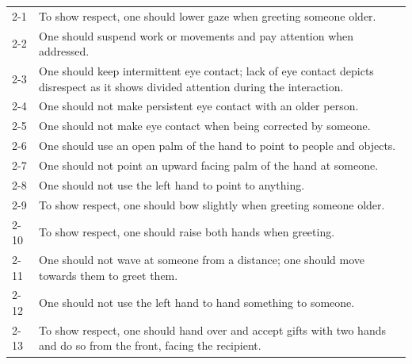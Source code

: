 \documentclass{CSSRforAfrica}
\begin{document}
\begin{table}[H]
\begin{center}
\begin{tabularx}{\linewidth}{|l|X|}
\hline \hline
 {\small 2-1}   & {\small To show respect, one should lower gaze when greeting someone older.} \vspace{-10mm}\\
 {\small 2-2 }   & {\small  One should suspend work or movements and pay attention when addressed.}\vspace{-10mm}\\
 {\small 2-3 } & {\small  One should keep intermittent eye contact; lack of eye contact depicts disrespect as it shows divided attention during the interaction. }\\
 {\small 2-4 }  & {\small  One should not make persistent eye contact with an older person. }\vspace{-1mm}\\
 {\small 2-5 } & {\small  One should not make eye contact when being corrected by someone. }\vspace{-1mm}\\
 {\small 2-6}   & {\small One should use an open palm of the hand to point to people and objects.}\vspace{-1mm}\\
 {\small 2-7}   & {\small  One should not point an upward facing palm of the hand at someone.}\vspace{-1mm}\\
 {\small 2-8 }    & {\small  One should not use the left hand to point to anything. }\vspace{-1mm}\\
 {\small 2-9 }    & {\small  To show respect, one should bow slightly when greeting someone older.}\vspace{-1mm}\\
 {\small 2-10}    & {\small To show respect, one should raise both hands when greeting.}\\
 {\small 2-11}   & {\small  One should not wave at someone from a distance; one should move towards them to greet them.}\\
 {\small 2-12}  & {\small  One should not use the left hand to hand something to someone.}\\
 {\small 2-13 }   & {\small  To show respect, one should hand over and accept gifts with two hands and do so from the front, facing the recipient.}\\

\end{tabularx}
\end{center}
\end{table}
\end{document}
